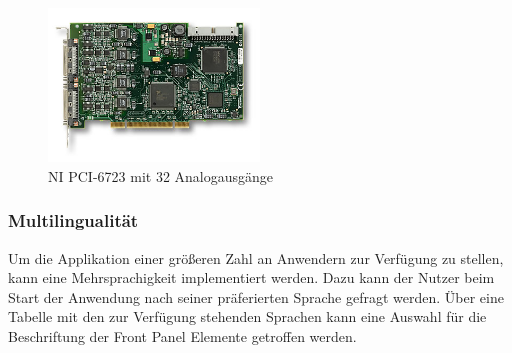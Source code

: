	\begin{figure}[h!]
	\centering
		\includegraphics[width=0.5\textwidth]{Pics/pci6723.jpg}
	\caption{NI PCI-6723 mit 32 Analogausgänge \cite{ni-pci} }
	\label{fig:a7}
	\end{figure}




\subsubsection{Multilingualität}
Um die Applikation einer größeren Zahl an Anwendern zur Verfügung zu stellen, kann eine Mehrsprachigkeit implementiert werden. 
Dazu kann der Nutzer beim Start der Anwendung  nach seiner präferierten Sprache gefragt werden. Über eine Tabelle mit den zur Verfügung stehenden Sprachen kann
eine Auswahl für die Beschriftung der Front Panel Elemente getroffen werden.





